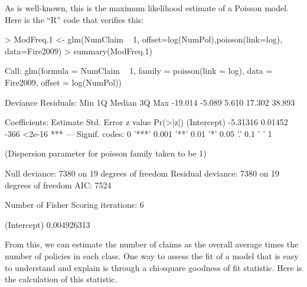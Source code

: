 \documentclass[12pt,letterpaper]{article}
\begin{document}
As is well-known, this is the maximum likelihood estimate of a Poisson model. Here is the ``R'' code that verifies this:

\begin{Schunk}
\begin{Sinput}
> ModFreq.1 <- glm(NumClaim ~ 1, offset=log(NumPol),poisson(link=log), data=Fire2009)
> summary(ModFreq.1)
\end{Sinput}
\begin{Soutput}
Call:
glm(formula = NumClaim ~ 1, family = poisson(link = log), data = Fire2009, 
    offset = log(NumPol))

Deviance Residuals: 
    Min       1Q   Median       3Q      Max  
-19.014   -5.089    5.610   17.302   38.893  

Coefficients:
            Estimate Std. Error z value Pr(>|z|)    
(Intercept) -5.31316    0.01452    -366   <2e-16 ***
---
Signif. codes:  0 '***' 0.001 '**' 0.01 '*' 0.05 '.' 0.1 ' ' 1

(Dispersion parameter for poisson family taken to be 1)

    Null deviance: 7380  on 19  degrees of freedom
Residual deviance: 7380  on 19  degrees of freedom
AIC: 7524

Number of Fisher Scoring iterations: 6
\end{Soutput}
\begin{Soutput}
(Intercept) 
0.004926313 
\end{Soutput}
\end{Schunk}

From this, we can estimate the number of claims as the overall average times the number of policies in each class. 
One way to assess the fit of a model that is easy to understand and explain is through a chi-square goodness of fit statistic. 
Here is the calculation of this statistic.
\end{document}
